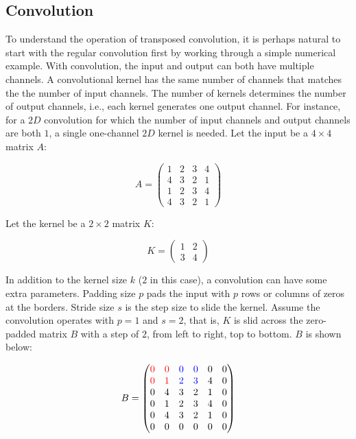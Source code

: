 \subsection{Convolution}

To understand the operation of transposed convolution, it is perhaps natural to start with the regular
convolution first by working through a simple numerical example. With convolution, the input and output
can both have multiple channels. A convolutional kernel has the same number of channels that matches the
the number of input channels. The number of kernels determines the number of output channels, i.e., each
kernel generates one output channel. For instance, for a $2D$ convolution for which the number of input
channels and output channels are both $1$, a single one-channel $2D$ kernel is needed. Let the input be
a $4 \times 4$ matrix $A$:

$$
A =
  \begin{pmatrix}
    1 & 2 & 3 & 4 \\
    4 & 3 & 2 & 1 \\
    1 & 2 & 3 & 4 \\
    4 & 3 & 2 & 1
  \end{pmatrix}
$$

Let the kernel be a $2 \times 2$ matrix $K$:

$$
K =
  \begin{pmatrix}
    1 & 2 \\
    3 & 4
  \end{pmatrix}
$$

In addition to the kernel size $k$ ($2$ in this case),
a convolution can have some extra parameters. Padding size $p$ pads the input with $p$ rows or columns
of zeros at the borders. Stride size $s$ is the step size to slide the kernel. Assume the convolution operates
with $p = 1$ and $s = 2$, that is, $K$ is slid across the zero-padded matrix $B$ with a step of
$2$, from left to right, top to bottom. $B$ is shown below:

$$
B =
  \begin{pmatrix}
    {\color{red}0} & {\color{red}0} & {\color{blue}0} & {\color{blue}0} & 0 & 0 \\
    {\color{red}0} & {\color{red}1} & {\color{blue}2} & {\color{blue}3} & 4 & 0 \\
    0 & 4 & 3 & 2 & 1 & 0 \\
    0 & 1 & 2 & 3 & 4 & 0 \\
    0 & 4 & 3 & 2 & 1 & 0 \\
    0 & 0 & 0 & 0 & 0 & 0
  \end{pmatrix}
$$

